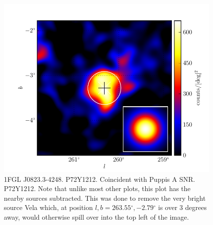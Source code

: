 \documentclass[preprint]{aastex}
\renewcommand{\deg}{\ensuremath{^\circ}\xspace}
\begin{document}
  \begin{figure}
    \begin{center}
      \includegraphics[type=pdf,ext=.pdf,read=.pdf]{source_plots/source_1FGL_J0823.3-4248}
    \end{center}
    \caption{1FGL J0823.3-4248. P72Y1212. Coincident with Puppis A SNR.
    P72Y1212.
    Note that unlike most other plots, this plot has the nearby sources subtracted.
    This was done to remove the very bright source Vela which,
    at position $l,b=263.55\deg,-2.79\deg$ is over 3 degrees away,
    would otherwise spill over into the top left of the image.
    }
  \end{figure}
\end{document}
